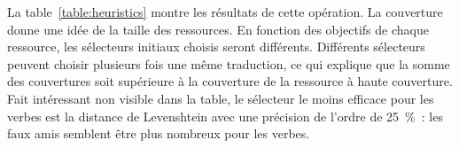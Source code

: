 
La table~\ref{table:heuristics} montre les résultats de cette opération. La
couverture donne une idée de la taille des ressources. En fonction des
objectifs de chaque ressource, les sélecteurs initiaux choisis seront
différents. Différents sélecteurs peuvent choisir plusieurs fois une même
traduction, ce qui explique que la somme des couvertures soit supérieure à la
couverture de la ressource à haute couverture. Fait intéressant non visible
dans la table, le sélecteur le moins efficace pour les verbes est la distance
de Levenshtein avec une précision de l'ordre de 25~\%~: les faux amis semblent
être plus nombreux pour les verbes.

